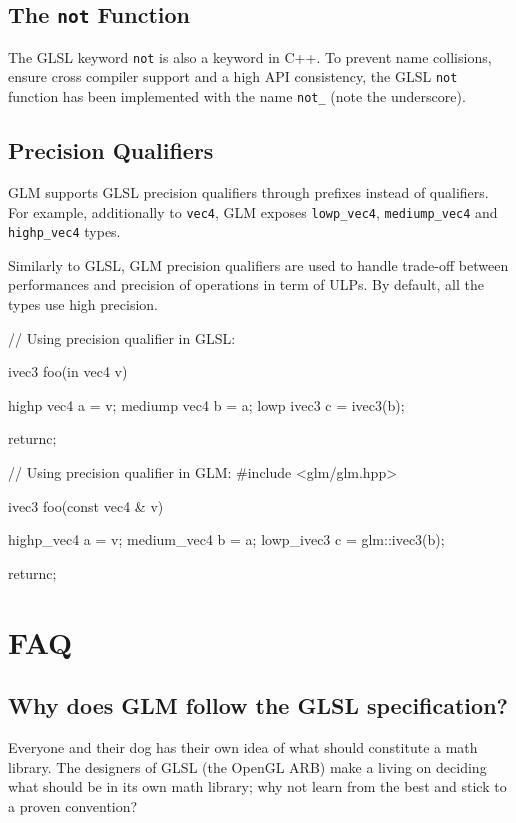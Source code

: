 \documentclass{scrartcl}
\numberwithin{figure}{subsection}
\begin{document}
\subsection{The \texttt{not} Function}

The GLSL keyword \verb|not| is also a keyword in C++. To prevent name collisions, ensure cross compiler support and a high API consistency, the GLSL \verb|not| function has been implemented with the name \verb|not_| (note the underscore).

\subsection{Precision Qualifiers}

GLM supports GLSL precision qualifiers through prefixes instead of qualifiers. For example, additionally to \verb|vec4|, GLM exposes \verb|lowp_vec4|, \verb|mediump_vec4| and \verb|highp_vec4| types.

Similarly to GLSL, GLM precision qualifiers are used to handle trade-off between performances and precision of operations in term of ULPs. 
By default, all the types use high precision.

\begin{glslcode}
// Using precision qualifier in GLSL:

ivec3 foo(in vec4 v)
{
  highp vec4 a = v;
  mediump vec4 b = a;
  lowp ivec3 c = ivec3(b);

  returnc;
}
\end{glslcode}

\begin{cppcode}
// Using precision qualifier in GLM:
#include <glm/glm.hpp>

ivec3 foo(const vec4 & v)
{
  highp_vec4 a = v;
  medium_vec4 b = a;
  lowp_ivec3 c = glm::ivec3(b);

  returnc;
}
\end{cppcode}

\newpage{}

\section{FAQ}

\subsection{Why does GLM follow the GLSL specification?}

Everyone and their dog has their own idea of what should constitute a math library.  The designers of GLSL (the OpenGL ARB) make a living on deciding what should be in its own math library; why not learn from the best and stick to a proven convention?
\end{document}
